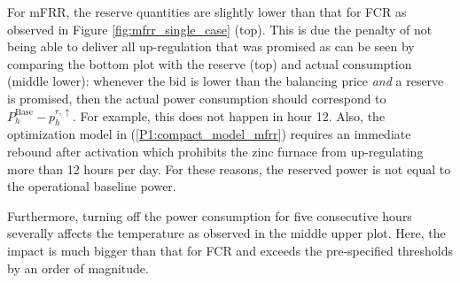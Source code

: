 \documentclass[conference]{IEEEtran}
\begin{document}
For mFRR, the reserve quantities are slightly lower than that for FCR as observed in Figure \ref{fig:mfrr_single_case} (top). This is due the penalty of not being able to deliver all up-regulation that was promised as can be seen by comparing the bottom plot with the reserve (top) and actual consumption (middle lower): whenever the bid is lower than the balancing price \textit{and} a reserve is promised, then the actual power consumption should correspond to $P^{\text{Base}}_{h} - p_{h}^{r, \uparrow}$. For example, this does not happen in hour 12. Also, the optimization model in (\ref{P1:compact_model_mfrr}) requires an immediate rebound after activation which prohibits the zinc furnace from up-regulating more than 12 hours per day. For these reasons, the reserved power is not equal to the operational baseline power.

Furthermore, turning off the power consumption for five consecutive hours severally affects the temperature as observed in the middle upper plot. Here, the impact is much bigger than that for FCR and exceeds the pre-specified thresholds by an order of magnitude.
\end{document}
